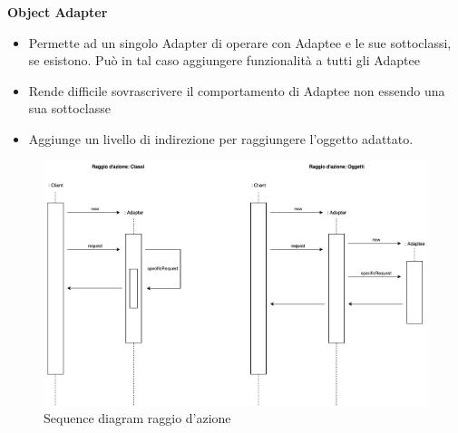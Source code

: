 \textbf{Object Adapter}
\begin{itemize}
    \item Permette ad un singolo Adapter di operare con Adaptee e le sue sottoclassi, se esistono. Può in tal caso aggiungere funzionalità a tutti gli Adaptee
    \item Rende difficile sovrascrivere il comportamento di Adaptee non essendo una sua sottoclasse
    \item Aggiunge un livello di indirezione per raggiungere l'oggetto adattato.
\end{itemize}

\begin{figure}[H]
    \centering
    \includegraphics[width=1\linewidth]{assets/pattern/adapter/adapter-sequence.drawio.png}
    \caption{Sequence diagram raggio d'azione}
\end{figure}

\newpage